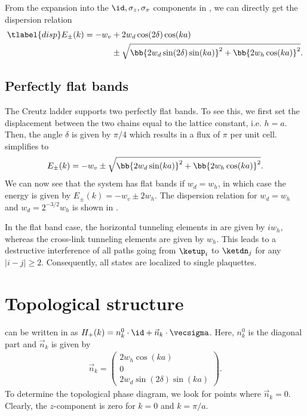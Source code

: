 From the expansion into the $\id, \sigma_z, \sigma_x$ components in , we can directly get the dispersion relation
\begin{align} \tlabel{disp}
    E_\pm(k) = -w_v &+ 2w_d \cos(2\delta)\cos(ka) \\
                    &\pm \sqrt{ \bb{ 2w_d\sin(2\delta)\sin(ka) }^2 + \bb{ 2w_h\cos(ka) }^2 }.
\end{align}

\subsection{Perfectly flat bands}
The Creutz ladder supports two perfectly flat bands. To see this, we first set the displacement between the two chains equal to the lattice constant, i.e. $h=a$.
Then, the angle $\delta$ is given by $\pi/4$ which results in a flux of $\pi$ per unit cell.
 simplifies to
\begin{align}
    E_\pm(k) = -w_v \pm \sqrt{ \bb{ 2w_d\sin(ka) }^2 + \bb{ 2w_h\cos(ka) }^2 }.
\end{align}
We can now see that the system has flat bands if $w_d = w_h$, in which case the energy is given by $E_\pm(k) = -w_v \pm 2 w_h$.
The dispersion relation for $w_d=w_h$ and $w_d = 2^{-3/2} w_h$ is shown in .

In the flat band case, the horizontal tunneling elements in  are given by $i w_h$, whereas the cross-link tunneling elements are given by $w_h$.
This leads to a destructive interference of all paths going from $\ketup_i$ to $\ketdn_{j}$ for any $|i-j|\ge 2$.
Consequently, all states are localized to single plaquettes.


\section{Topological structure}
 can be written in as $H_+(k) = n^0_k \cdot \id + \vec{n}_k \cdot \vecsigma$. Here, $n^0_k$ is the diagonal part and $\vec{n}_k$ is given by
\begin{align}
    \vec{n}_k = \begin{pmatrix}
        2 w_h \cos(ka) \\
        0 \\
        2 w_d \sin(2\delta) \sin(ka)
    \end{pmatrix}.
\end{align}
To determine the topological phase diagram, we look for points where $\vec{n}_k=0$. Clearly, the $z$-component is zero for $k = 0$ and $k=\pi/a$.

